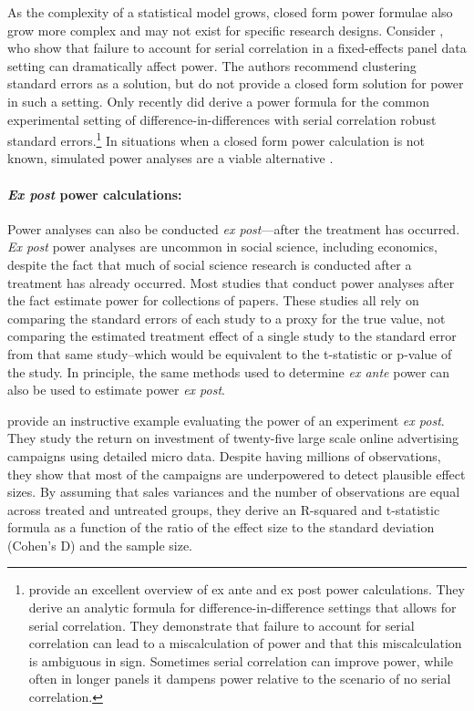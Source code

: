 \documentclass[12pt]{article}%
\begin{document}
As the complexity of a statistical model grows, closed form power formulae also grow more complex and may not exist for specific research designs.  
Consider \citet{Bertrand2004}, who show that failure to account for serial correlation in a fixed-effects panel data setting can dramatically affect power.  
The authors recommend clustering standard errors as a solution, but do not provide a closed form solution for power in such a setting.
Only recently did \citet{Burlig2019} derive a power formula for the common experimental setting of difference-in-differences with serial correlation robust standard errors.\footnote{\citet{Burlig2019} provide an excellent overview of ex ante and ex post power calculations. They derive an analytic formula for difference-in-difference settings that allows for serial correlation. They demonstrate that failure to account for serial correlation can lead to a miscalculation of power and that this miscalculation is ambiguous in sign. Sometimes serial correlation can improve power, while often in longer panels it dampens power relative to the scenario of no serial correlation.}
In situations when a closed form power calculation is not known, simulated power analyses are a viable alternative  \citep{Arnold2011, Burlig2019}.


\paragraph{\emph{Ex post} power calculations: }
Power analyses can also be conducted \emph{ex post}---after the treatment has occurred. 
\emph{Ex post} power analyses are uncommon in social science, including economics, despite the  fact that much of social science research is conducted after a treatment has already occurred. 
Most studies that conduct power analyses after the fact estimate power for collections of papers. 
These studies all rely on comparing the standard errors of each study to a proxy for the true value, not comparing the estimated treatment effect of a single study to the standard error from that same study--which would be equivalent to the t-statistic or p-value of the study. 
In principle, the same methods used to determine \emph{ex ante} power can also be used to estimate power \emph{ex post}.

\citet{Lewis2015} provide an instructive example evaluating the power of an experiment \emph{ex post}. 
They study the return on investment of twenty-five large scale online advertising campaigns using detailed micro data.
Despite having millions of observations, they show that most of the campaigns are underpowered to detect plausible effect sizes. 
By assuming that sales variances and the number of observations are equal across treated and untreated groups, they derive an R-squared and t-statistic formula as a function of the ratio of the effect size to the standard deviation (Cohen’s D) and the sample size.  
\end{document}
